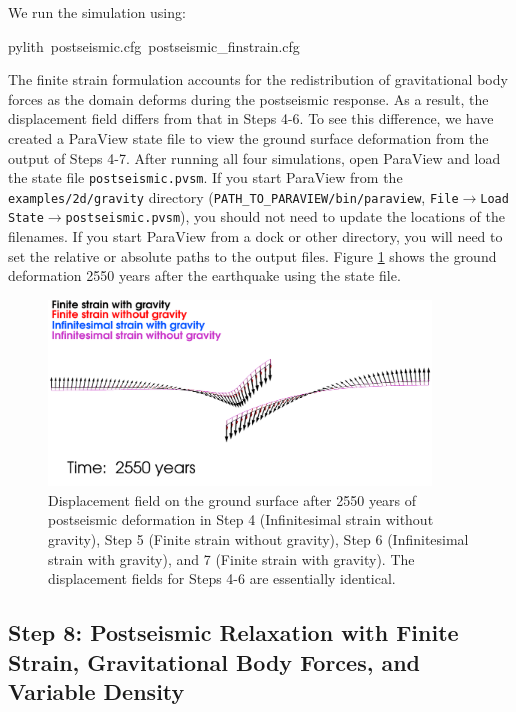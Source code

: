 We run the simulation using:
\begin{lyxcode}
pylith~postseismic.cfg~postseismic\_finstrain.cfg
\end{lyxcode}
The finite strain formulation accounts for the redistribution of gravitational
body forces as the domain deforms during the postseismic response.
As a result, the displacement field differs from that in Steps 4-6.
To see this difference, we have created a ParaView state file to view
the ground surface deformation from the output of Steps 4-7. After
running all four simulations, open ParaView and load the state file
\texttt{postseismic.pvsm}. If you start ParaView from the \texttt{examples/2d/gravity}
directory (\texttt{PATH\_TO\_PARAVIEW/bin/paraview}, \texttt{File$\rightarrow$Load
State$\rightarrow$postseismic.pvsm}), you should not need to update
the locations of the filenames. If you start ParaView from a dock
or other directory, you will need to set the relative or absolute
paths to the output files. Figure \ref{fig:examples:gravity:2d:postseismic:groundsurf}
shows the ground deformation 2550 years after the earthquake using
the state file.

\begin{figure}
\begin{centering}
\includegraphics[width=4in]{tutorials/grav2d/figs/postseismic_dispcmp}
\par\end{centering}

\caption{Displacement field on the ground surface after 2550 years of postseismic
deformation in Step 4 (Infinitesimal strain without gravity), Step
5 (Finite strain without gravity), Step 6 (Infinitesimal strain with
gravity), and 7 (Finite strain with gravity). The displacement fields
for Steps 4-6 are essentially identical. \label{fig:examples:gravity:2d:postseismic:groundsurf}}
\end{figure}



\subsection{Step 8: Postseismic Relaxation with Finite Strain, Gravitational
Body Forces, and Variable Density}

